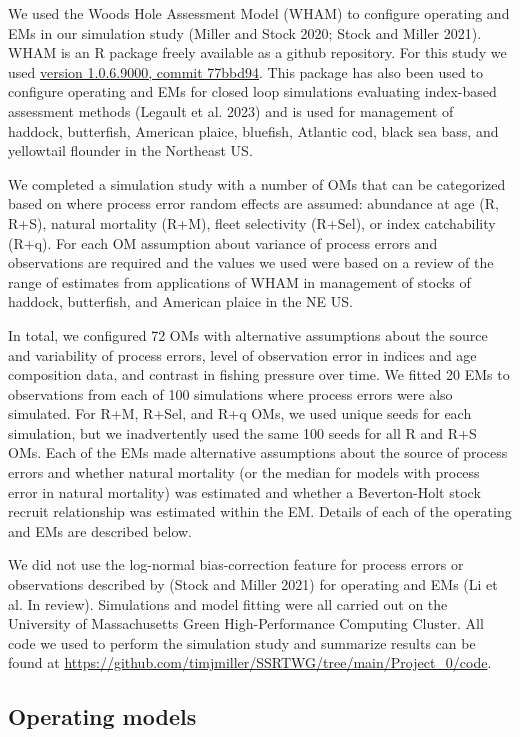 \documentclass[
  12pt,
]{article}
\begin{document}
We used the Woods Hole Assessment Model (WHAM) to configure operating
and EMs in our simulation study (Miller and Stock 2020; Stock and Miller
2021). WHAM is an R package freely available as a github repository. For
this study we used
\href{https://github.com/timjmiller/wham/tree/77bbd946e4881216a439933473d1c58b21c270c3}{version
1.0.6.9000, commit 77bbd94}. This package has also been used to
configure operating and EMs for closed loop simulations evaluating
index-based assessment methods (Legault et al. 2023) and is used for
management of haddock, butterfish, American plaice, bluefish, Atlantic
cod, black sea bass, and yellowtail flounder in the Northeast US.

We completed a simulation study with a number of OMs that can be
categorized based on where process error random effects are assumed:
abundance at age (R, R+S), natural mortality (R+M), fleet selectivity
(R+Sel), or index catchability (R+q). For each OM assumption about
variance of process errors and observations are required and the values
we used were based on a review of the range of estimates from
applications of WHAM in management of stocks of haddock, butterfish, and
American plaice in the NE US.

In total, we configured 72 OMs with alternative assumptions about the
source and variability of process errors, level of observation error in
indices and age composition data, and contrast in fishing pressure over
time. We fitted 20 EMs to observations from each of 100 simulations
where process errors were also simulated. For R+M, R+Sel, and R+q OMs,
we used unique seeds for each simulation, but we inadvertently used the
same 100 seeds for all R and R+S OMs. Each of the EMs made alternative
assumptions about the source of process errors and whether natural
mortality (or the median for models with process error in natural
mortality) was estimated and whether a Beverton-Holt stock recruit
relationship was estimated within the EM. Details of each of the
operating and EMs are described below.

We did not use the log-normal bias-correction feature for process errors
or observations described by (Stock and Miller 2021) for operating and
EMs (Li et al. In review). Simulations and model fitting were all
carried out on the University of Massachusetts Green High-Performance
Computing Cluster. All code we used to perform the simulation study and
summarize results can be found at
\url{https://github.com/timjmiller/SSRTWG/tree/main/Project_0/code}.

\hypertarget{operating-models}{%
\subsection*{Operating models}\label{operating-models}}
\end{document}
